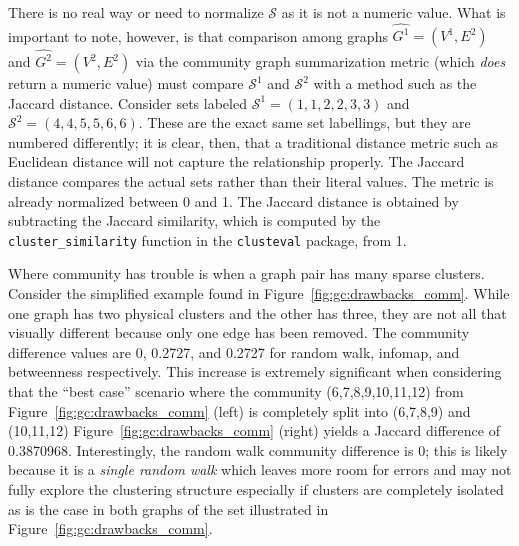 There is no real way or need to normalize $\mathcal{S}$ as it is not a numeric 
value. What is important to note, however, is that comparison among 
graphs $\hat{G^1}=(V^1,E^2)$ and $\hat{G^2}=(V^2,E^2)$ via the community graph 
summarization metric (which \textit{does} return a numeric value)
must compare $\mathcal{S}^1$ and $\mathcal{S}^2$ with a method such as the 
Jaccard distance. Consider sets labeled $\mathcal{S}^1=(1,1,2,2,3,3)$ and 
$\mathcal{S}^2=(4,4,5,5,6,6)$. These are the exact same set labellings, but 
they are numbered differently; it is clear, then, that a traditional distance 
metric such as Euclidean distance will not capture the relationship properly. 
The Jaccard distance compares the actual sets rather than their literal values. 
The metric is already normalized between 0 and 1.
The Jaccard distance is obtained by subtracting the Jaccard similarity, which 
is computed by the \texttt{cluster\_similarity} function in the 
\texttt{clusteval} package, from 1.

Where community has trouble is when a graph pair has many sparse clusters. 
Consider the simplified example found in Figure~\ref{fig:gc:drawbacks_comm}. 
While one graph has two physical clusters and the other has three, they are not 
all that visually different because only one edge has been removed. The 
community difference values are 0, 0.2727, and 0.2727 for random walk, infomap, 
and betweenness respectively. This increase is extremely significant when 
considering that the ``best case'' scenario where the community 
(6,7,8,9,10,11,12)  from Figure~\ref{fig:gc:drawbacks_comm} (left) is 
completely split into (6,7,8,9) and (10,11,12) 
Figure~\ref{fig:gc:drawbacks_comm} (right) yields a Jaccard difference of 
0.3870968. Interestingly, the random walk community difference is 0; this is 
likely because it is a \textit{single random walk} which leaves more room for 
errors and may not fully explore the clustering structure especially if 
clusters are completely isolated as is the case in both graphs of the set 
illustrated in Figure~\ref{fig:gc:drawbacks_comm}.










